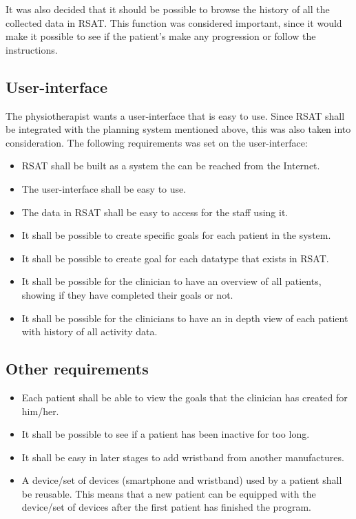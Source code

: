 \documentclass{cslthse-msc}
\begin{document}
It was also decided that it should be possible to browse the history of all the collected data in RSAT. This function was considered important, since it would make it possible to see if the patient’s make any progression or follow the instructions.

\subsection{User-interface}
The physiotherapist wants a user-interface that is easy to use. Since RSAT shall be integrated with the planning system mentioned above, this was also taken into consideration. The following requirements was set on the user-interface:

\begin{itemize}
    \item RSAT shall be built as a system the can be reached from the Internet.
    \item The user-interface shall be easy to use.
    \item The data in RSAT shall be easy to access for the staff using it.
    \item It shall be possible to create specific goals for each patient in the system.
    \item It shall be possible to create goal for each datatype that exists in RSAT.
    \item It shall be possible for the clinician to have an overview of all patients, showing if they have completed their goals or not. 

    \item It shall be possible for the clinicians to have an in depth view of each patient with history of all activity data.

\end{itemize}

\subsection{Other requirements}
\begin{itemize}
    \item Each patient shall be able to view the goals that the clinician has created for him/her.
    \item It shall be possible to see if a patient has been inactive for too long.%
    \item It shall be easy in later stages to add wristband from another manufactures. 
    \item A device/set of devices (smartphone and wristband) used by a patient shall be reusable. This means that a new patient can be equipped with the device/set of devices after the first patient has finished the program. 
\end{itemize}
\end{document}
